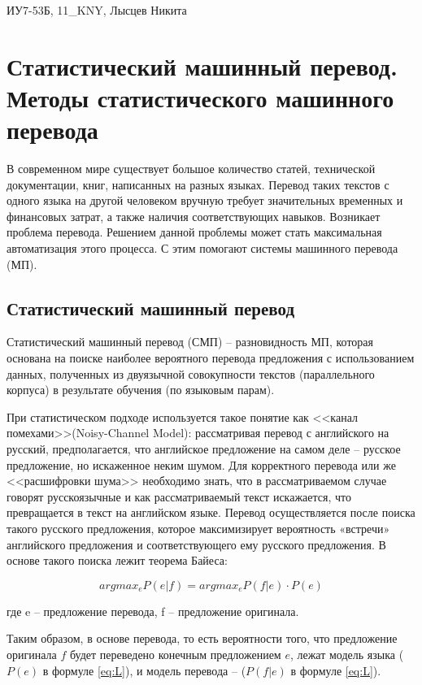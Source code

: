 ИУ7-53Б, 11\_KNY, Лысцев Никита

\chapter{Статистический машинный перевод. Методы статистического машинного перевода}


В современном мире существует большое количество статей, технической документации, книг, написанных на разных языках. Перевод таких текстов с одного языка на другой человеком вручную требует значительных временных и финансовых затрат, а также наличия соответствующих навыков. Возникает проблема перевода. Решением данной проблемы может стать максимальная автоматизация этого процесса. С этим помогают системы машинного перевода (МП).


\section{Статистический машинный перевод}

Статистический машинный перевод (СМП) -- разновидность МП, которая основана на поиске наиболее вероятного перевода предложения с использованием данных, полученных из двуязычной совокупности текстов (параллельного корпуса) в результате  обучения (по языковым парам)\cite{smt}.

При статистическом подходе используется такое понятие как <<канал   помехами>>(Noisy-Channel Model)\cite{smt_book}: рассматривая перевод с английского на русский, предполагается, что английское предложение на самом деле – русское предложение, но искаженное неким шумом. Для корректного перевода или же <<расшифровки шума>> необходимо знать, что в рассматриваемом случае говорят русскоязычные и как рассматриваемый текст искажается, что превращается в текст на английском языке. Перевод осуществляется после поиска такого русского предложения, которое максимизирует вероятность «встречи» английского предложения и соответствующего ему русского предложения. В основе такого поиска лежит теорема Байеса:

\begin{equation}
	\label{eq:L}
	arg max_e P(e|f) = arg max_e P(f|e) \cdot P(e)
\end{equation}

где e -- предложение перевода, f -- предложение оригинала.

Таким образом, в основе перевода, то есть вероятности того, что
предложение оригинала $f$ будет переведено конечным предложением $e$, лежат модель языка ($P(e)$ в формуле \ref{eq:L}), и модель перевода -- ($P(f|e)$ в формуле \ref{eq:L}). 

